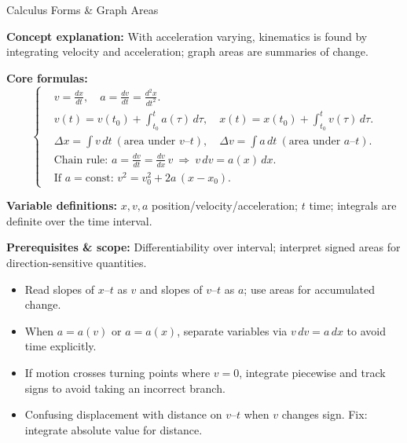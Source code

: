 \begin{KnowledgePoint}{Calculus Forms \& Graph Areas \Extension}
  \KPFormulas
  \begin{formulabox}
  \textbf{Concept explanation:} With acceleration varying, kinematics is found by integrating velocity and acceleration; graph areas are summaries of change.

  \textbf{Core formulas:}
  \[
  \left\{\begin{aligned}
    &v=\frac{dx}{dt},\quad a=\frac{dv}{dt}=\frac{d^2x}{dt^2}.\\
    &v(t)=v(t_0)+\int_{t_0}^t a(\tau)\,d\tau,\quad x(t)=x(t_0)+\int_{t_0}^t v(\tau)\,d\tau.\\
    &\Delta x=\int v\,dt\ (\text{area under }v\text{--}t),\quad \Delta v=\int a\,dt\ (\text{area under }a\text{--}t).\\
    &\text{Chain rule: } a=\frac{dv}{dt}=\frac{dv}{dx}\,v\ \Rightarrow\ v\,dv=a(x)\,dx.\\
    &\text{If }a=\text{const: } v^2=v_0^2+2a\,(x-x_0).
  \end{aligned}\right.
  \]

  \textbf{Variable definitions:} $x,v,a$ position/velocity/acceleration; $t$ time; integrals are definite over the time interval.

  \textbf{Prerequisites \& scope:} Differentiability over interval; interpret signed areas for direction-sensitive quantities.
  \end{formulabox}

  \KPHeuristics
  \begin{heuristicsbox}
  \begin{itemize}[leftmargin=*]
    \item Read slopes of $x$--$t$ as $v$ and slopes of $v$--$t$ as $a$; use areas for accumulated change.
    \item When $a=a(v)$ or $a=a(x)$, separate variables via $v\,dv=a\,dx$ to avoid time explicitly.
    \item If motion crosses turning points where $v=0$, integrate piecewise and track signs to avoid taking an incorrect branch.
  \end{itemize}
  \vspace{0.4em}
  \begin{itemize}[leftmargin=*]
    \item Confusing displacement with distance on $v$--$t$ when $v$ changes sign. Fix: integrate absolute value for distance.
  \end{itemize}
  \end{heuristicsbox}


\end{KnowledgePoint}

